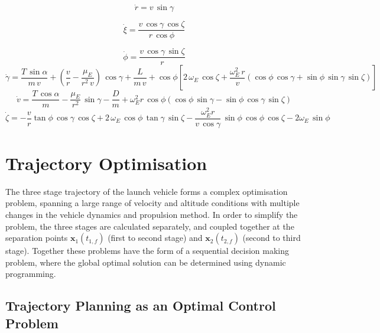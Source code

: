 \documentclass[journal]{new-aiaa}
\begin{document}
\begin{equation}
\dot{r} = v \, \sin \gamma
\end{equation}

\begin{equation}
\dot{\xi} = \frac{v \, \cos \gamma \, \cos \zeta}{r \, \cos \phi}
\end{equation}

\begin{equation}
\dot{\phi} = \frac{v\,\cos\gamma\,\sin\zeta}{r}
\end{equation}
\begin{equation}
\dot{\gamma} = \frac{T\,\sin\alpha}{m\,v}+ (\frac{v}{r}-\frac{\mu_E}{r^2 \,v})\,\cos\gamma + \frac{L}{m\,v}
 + \cos\phi[2\,\omega_E\, \cos\zeta + \frac{\omega_E^2\, r}{v}(\cos\phi\,\cos\gamma+\sin\phi\,\sin\gamma\,\sin\zeta)]
 \end{equation}
\begin{equation}
\dot{v} = \frac{T\,\cos\alpha}{m}-\frac{\mu_E}{r^2}\,\sin\gamma - \frac{D}{m}
+ \omega_E^2 r\,\cos\phi(\cos\phi\,\sin\gamma-\sin\phi\,\cos\gamma\,\sin\zeta)
\end{equation}
\begin{equation}
\dot{\zeta} = -\frac{v}{r}\tan\phi\,\cos\gamma\,\cos\zeta +2\,\omega_E\,\cos\phi\,\tan\gamma\,\sin\zeta - \frac{\omega_E^2 r}{v\,\cos\gamma}\,\sin\phi \, \cos\phi\,\cos\zeta-2\omega_E\,\sin\phi 
\end{equation}


\section{Trajectory Optimisation} \label{section:optimisation}

The three stage trajectory of the launch vehicle forms a complex optimisation problem, spanning a large range of velocity and altitude conditions with multiple changes in the vehicle dynamics and propulsion method. In order to simplify the problem, the three stages are calculated separately, and coupled together at the separation points $\textbf{x}_1(t_{1,f})$ (first to second stage) and  $\textbf{x}_2(t_{2,f})$ (second to third stage). Together these problems have the form of a sequential decision making problem, where the global optimal solution can be determined using dynamic programming\cite{Bertsekas2005}. 



\subsection{Trajectory Planning as an Optimal Control Problem}
\end{document}
